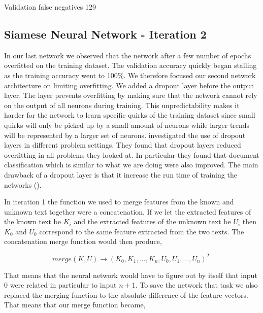 Validation false negatives 129


\subsection{Siamese Neural Network - Iteration 2}


In our last network we observed that the network after a few number of epochs
overfitted on the training dataset. The validation accuracy quickly began
stalling as the training accuracy went to 100\%. We therefore focused our
second network architecture on limiting overfitting. We added a dropout layer
before the output layer. The layer prevents overfitting by making sure that
the network cannot rely on the output of all neurons during training. This
unpredictability makes it harder for the network to learn specific quirks of
the training dataset since small quirks will only be picked up by a small
amount of neurons while larger trends will be represented by a larger set
of neurons. \cite{JMLR:v15:srivastava14a} investigated the use of dropout
layers in different problem settings. They found that dropout layers reduced
overfitting in all problems they looked at. In particular they found that
document classification which is similar to what we are doing were also
improved. The main drawback of a dropout layer is that it increase the run time
of training the networks (\cite{JMLR:v15:srivastava14a}).

In iteration 1 the function we used to merge features from the known and unknown
text together were a concatenation. If we let the extracted features of the
known text be $K_i$ and the extracted features of the unknown text be $U_i$ then
$K_0$ and $U_0$ correspond to the same feature extracted from the two texts. The
concatenation merge function would then produce,

\begin{equation}
    merge(K, U) \rightarrow \left(
        K_0, K_1, \dots, K_n, U_0, U_1, \dots, U_n
    \right)^T.
\end{equation}

That means that the neural network would have to figure out by itself that input
$0$ were related in particular to input $n + 1$. To save the network that task
we also replaced the merging function to the absolute difference of the feature
vectors. That means that our merge function became,

